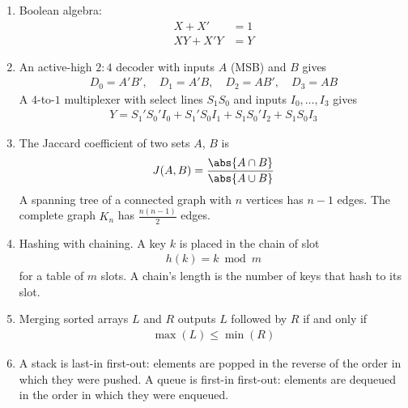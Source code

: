 \begin{enumerate}[label=\thesubsection.\arabic*, ref=\thesubsection.\theenumi]
\item Boolean algebra:
\begin{align}
X + X' &= 1 \label{eq:bool-comp} \\
XY + X'Y &= Y \label{eq:bool-comb}
\end{align}

\item An active-high $2:4$ decoder with inputs $A$ (MSB) and $B$ gives
\begin{align}
D_0 = A'B', \quad D_1 = A'B, \quad D_2 = AB', \quad D_3 = AB
\label{eq:decoder}
\end{align}
A $4$-to-$1$ multiplexer with select lines $S_1 S_0$ and inputs
$I_0, \dots, I_3$ gives
\begin{align}
Y = S_1'S_0' I_0 + S_1'S_0 I_1 + S_1 S_0' I_2 + S_1 S_0 I_3
\label{eq:mux}
\end{align}

\item The Jaccard coefficient of two sets $A$, $B$ is
\begin{align}
J(A, B) = \frac{\abs{A \cap B}}{\abs{A \cup B}}
\label{eq:jaccard}
\end{align}
A spanning tree of a connected graph with $n$ vertices has $n - 1$ edges.
The complete graph $K_n$ has $\frac{n(n-1)}{2}$ edges.

\item Hashing with chaining. A key $k$ is placed in the chain of slot
\begin{align}
h(k) = k \bmod m
\label{eq:hash}
\end{align}
for a table of $m$ slots. A chain's length is the number of keys that
hash to its slot.

\item Merging sorted arrays $L$ and $R$ outputs $L$ followed by $R$ if and
only if
\begin{align}
\max(L) \le \min(R)
\label{eq:merge-void}
\end{align}

\item A stack is last-in first-out: elements are popped in the reverse of
the order in which they were pushed. A queue is first-in first-out:
elements are dequeued in the order in which they were enqueued.
\label{fm:stack-queue}


\end{enumerate}
